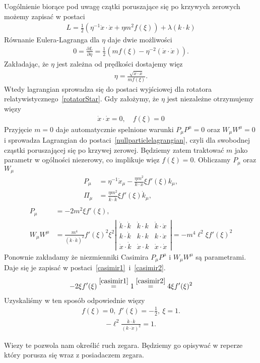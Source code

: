 Uogólnienie biorące pod uwagę czątki poruszające się
po krzywych zerowych możemy zapisać w 
postaci~\cite{polchinski_1998}
\begin{align}
L =  \frac{1}{2} \left(  
\eta^{-1} \dot{x} \cdot \dot{x} +  \eta m^2 f( \xi ) \right)  
+ \lambda ( k\cdot k )
\end{align}
Równanie Eulera-Lagranga dla $\eta$ daje dwie możliwości
\begin{align}
0 = \frac{\partial L }{\partial \eta} =  \frac{1}{2}
\left(m f(\xi) - \eta^{-2} ( \dot{x} \cdot \dot{x} )
  \right).
\end{align}
Zakładając, że $\eta$ jest zależna od prędkości 
dostajemy więz
\begin{align*}
\eta = \frac{\sqrt{\dot{x} \cdot \dot{x}}}{m f(\xi)}.
\end{align*}
Wtedy lagrangian sprowadza się do postaci wyjściowej 
dla rotatora relatywistycznego~\ref{rotatorStar}.
Gdy założymy, że $\eta$ jest niezależne otrzymujemy
więzy 
\begin{align}
\dot{x} \cdot \dot{x} = 0, \quad f(\xi) = 0
\end{align}
Przyjęcie $m =0$ daje automatycznie spelnione warunki 
$P_\mu P^\mu =0$ oraz $W_\mu W^\mu = 0$ i sprowadza 
Lagrangian do postaci~\ref{nullparticlelagrangian}, 
czyli dla swobodnej cząstki 
poruszającej się po krzywej zerowej.
Będziemy zatem traktować $m$ jako parametr w ogólności
niezerowy, co implikuje więz $f(\xi)=0$.
Obliczamy $P_\mu$ oraz $W_\mu$
\begin{align}
P_\mu &= \eta^{-1} \dot{x}_\mu - 
\frac{\eta m^2}{k\cdot \dot{x}} \xi f'(\xi) k_\mu,\\
\Pi_\mu &= \frac{\eta m^2}{\dot{k}\cdot \dot{k}}
\xi f'(\xi) \dot{k}_\mu, \\
\end{align}
\begin{align}
P_\mu &= -2 m^2 \xi f'(\xi),\\
W_\mu W^\mu &= \frac{m^4}{(\dot{k}\cdot \dot{k})^2}
f'(\xi)^2 \xi^2 
\left| 
\begin{array}{ccc}
\dot{k} \cdot \dot{k}& \dot{k} \cdot k& \dot{k} \cdot \dot{x}\\
k \cdot \dot{k}& k \cdot k &k  \cdot \dot{x}\\
\dot{x} \cdot \dot{k}& \dot{x} \cdot k &\dot{x} \cdot \dot{x}
\end{array}
\right|= 
- m^4 \ell^2 \xi f'(\xi)^2
\end{align}
Ponownie zakładamy
że niezmienniki Casimira $P_\mu P^\mu$ i $W_\mu W^\mu$ 
są parametrami. Daje się 
je zapisać w postaci~\ref{casimir1}~i~\ref{casimir2}.
\begin{align} 
 -2 \xi f'(\xi)
\stackrel{\ref{casimir1}}{=} 1 \stackrel{\ref{casimir2}}{=}
  4  \xi f'(\xi)^2
\end{align}
Uzyskaliśmy w ten sposób odpowiednie więzy 
\begin{align}
f(\xi) = 0, \ f'(\xi) =- \frac{1}{2},\ \xi = 1.
\end{align}
\begin{align} \label{wiez}
 - \ell^2 \frac{\dot{k} \cdot \dot{k}}{ ( k \cdot \dot{x})^2 } = 1.
\end{align}

Wiezy te pozwola nam określić ruch zegara. 
Będziemy go opisywać w reperze który porusza się 
wraz z posiadaczem zegara.  
